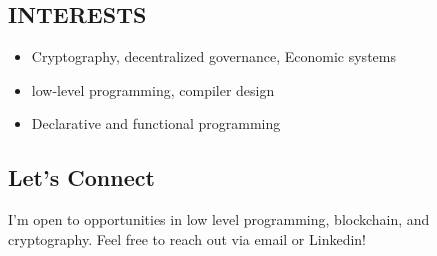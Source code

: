 \documentclass[10pt,letterpaper]{article}
\begin{document}
\begin{minipage}[t]{0.47\textwidth}
\subsection*{INTERESTS}
\label{sec:org1f6da6e}
\begin{itemize}
\item Cryptography, decentralized governance, Economic systems
\item low-level programming, compiler design
\item Declarative and functional programming
\end{itemize}

\vfill
\subsection*{Let's Connect}
\label{sec:orgc9f3fcc}
I'm open to opportunities in low level programming, blockchain, and cryptography. Feel free to reach out via email or Linkedin!
\end{minipage}
\end{document}

